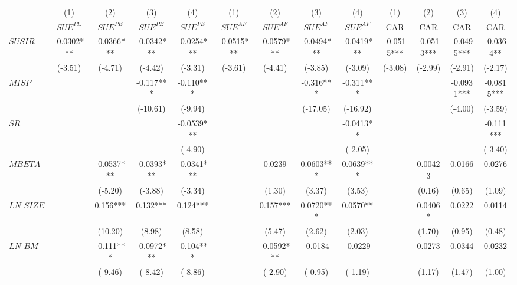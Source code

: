 \begin{tabular}{l|cccc|cccc|cccc}
\hline
\hline
        & (1)     & (2)     & (3)     & (4)     & (1)     & (2)     & (3)     & (4)     & (1)     & (2)     & (3)     & (4) \bigstrut[t]\\
        & $SUE^{PE}$ & $SUE^{PE}$ & $SUE^{PE}$ & $SUE^{PE}$ & $SUE^{AF}$ & $SUE^{AF}$ & $SUE^{AF}$ & $SUE^{AF}$ & CAR     & CAR     & CAR     & CAR \bigstrut[b]\\
\hline
$SUSIR$ & -0.0302*** & -0.0366*** & -0.0342*** & -0.0254*** & -0.0515*** & -0.0579*** & -0.0494*** & -0.0419*** & -0.0515*** & -0.0513*** & -0.0495*** & -0.0364** \bigstrut[t]\\
        & (-3.51) & (-4.71) & (-4.42) & (-3.31) & (-3.61) & (-4.41) & (-3.85) & (-3.09) & (-3.08) & (-2.99) & (-2.91) & (-2.17) \\
$MISP$  &         &         & -0.117*** & -0.110*** &         &         & -0.316*** & -0.311*** &         &         & -0.0931*** & -0.0815*** \\
        &         &         & (-10.61) & (-9.94) &         &         & (-17.05) & (-16.92) &         &         & (-4.00) & (-3.59) \\
$SR$    &         &         &         & -0.0539*** &         &         &         & -0.0413** &         &         &         & -0.111*** \\
        &         &         &         & (-4.90) &         &         &         & (-2.05) &         &         &         & (-3.40) \\
$MBETA$ &         & -0.0537*** & -0.0393*** & -0.0341*** &         & 0.0239  & 0.0603*** & 0.0639*** &         & 0.00423 & 0.0166  & 0.0276 \\
        &         & (-5.20) & (-3.88) & (-3.34) &         & (1.30)  & (3.37)  & (3.53)  &         & (0.16)  & (0.65)  & (1.09) \\
$LN\_SIZE$ &         & 0.156*** & 0.132*** & 0.124*** &         & 0.157*** & 0.0720*** & 0.0570** &         & 0.0406* & 0.0222  & 0.0114 \\
        &         & (10.20) & (8.98)  & (8.58)  &         & (5.47)  & (2.62)  & (2.03)  &         & (1.70)  & (0.95)  & (0.48) \\
$LN\_BM$ &         & -0.111*** & -0.0972*** & -0.104*** &         & -0.0592*** & -0.0184 & -0.0229 &         & 0.0273  & 0.0344  & 0.0232 \\
        &         & (-9.46) & (-8.42) & (-8.86) &         & (-2.90) & (-0.95) & (-1.19) &         & (1.17)  & (1.47)  & (1.00) \\

\end{tabular}
